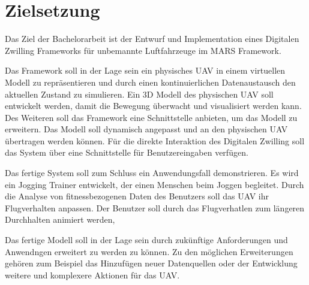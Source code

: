 \section{Zielsetzung}

Das Ziel der Bachelorarbeit ist der Entwurf und Implementation eines Digitalen Zwilling Frameworks für unbemannte Luftfahrzeuge im MARS Framework.

Das Framework soll in der Lage sein ein physisches UAV in einem virtuellen Modell zu repräsentieren und durch einen kontinuierlichen Datenaustausch den aktuellen Zustand zu simulieren. Ein 3D Modell des physischen UAV soll entwickelt werden, damit die Bewegung überwacht und visualisiert werden kann. Des Weiteren soll das Framework eine Schnittstelle anbieten, um das Modell zu erweitern. Das Modell soll dynamisch angepasst und an den physischen UAV übertragen werden können. Für die direkte Interaktion des Digitalen Zwilling soll das System über eine Schnittstelle für Benutzereingaben verfügen.

Das fertige System soll zum Schluss ein Anwendungsfall demonstrieren. Es wird ein Jogging Trainer entwickelt, der einen Menschen beim Joggen begleitet. Durch die Analyse von fitnessbezogenen Daten des Benutzers soll das UAV ihr Flugverhalten anpassen. Der Benutzer soll durch das Flugverhatlen zum längeren Durchhalten animiert werden, 

Das fertige Modell soll in der Lage sein durch zukünftige Anforderungen und Anwendngen erweitert zu werden zu können. Zu den möglichen Erweiterungen gehören zum Beispiel das Hinzufügen neuer Datenquellen oder der Entwicklung weitere und komplexere Aktionen für das UAV.
